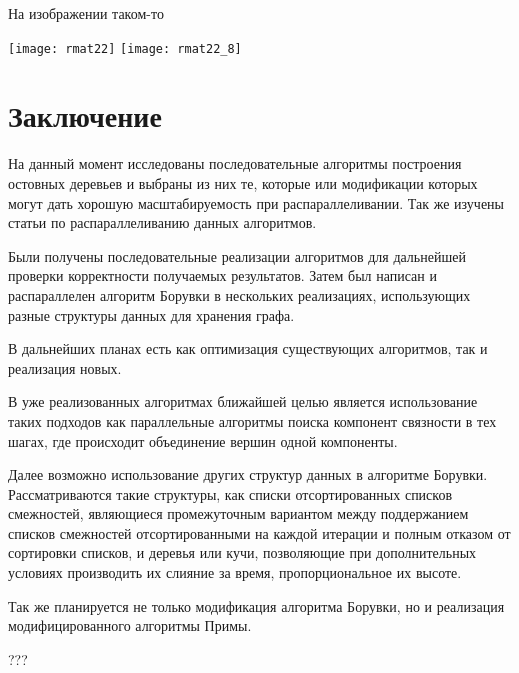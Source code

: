 \documentclass[a4paper,10pt]{extarticle}
\begin{document}

На изображении таком-то 

\texttt{[image: rmat22]}
\texttt{[image: rmat22\_8]}


\newpage
\section{Заключение}
На данный момент исследованы последовательные алгоритмы построения остовных деревьев и выбраны из них те, которые или модификации которых могут дать хорошую масштабируемость при распараллеливании. Так же изучены статьи  \cite{dense-mst,boruvka-prima,boruvka-cm5} по распараллеливанию данных алгоритмов.

Были получены последовательные реализации алгоритмов для дальнейшей проверки корректности получаемых результатов. Затем был написан и распараллелен алгоритм Борувки в нескольких реализациях, использующих разные структуры данных для хранения графа.

В дальнейших планах есть как оптимизация существующих алгоритмов, так и реализация новых.

В уже реализованных алгоритмах ближайшей целью является использование таких подходов как параллельные алгоритмы поиска компонент связности в тех шагах, где происходит объединение вершин одной компоненты.

Далее возможно использование других  структур данных в алгоритме Борувки. Рассматриваются такие структуры, как списки отсортированных списков смежностей, являющиеся промежуточным вариантом между поддержанием списков смежностей отсортированными на каждой итерации и полным отказом от сортировки списков, и деревья или кучи, позволяющие при дополнительных условиях производить их слияние за время, пропорциональное их высоте.

Так же планируется не только модификация алгоритма Борувки, но и реализация модифицированного алгоритмы Примы.

\newpage
???


\end{document}
